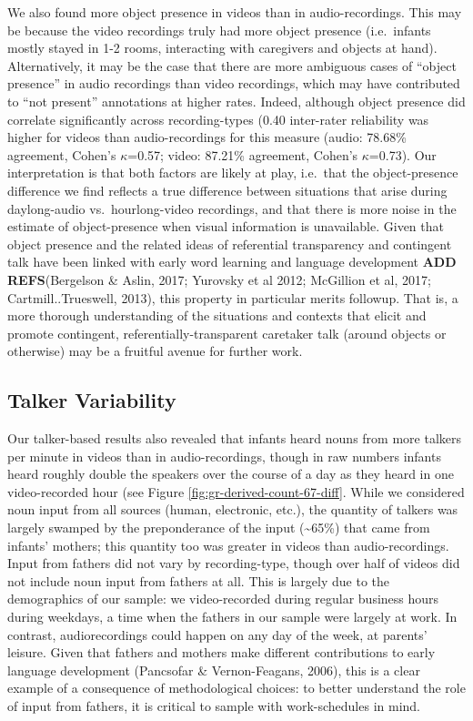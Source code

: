 \documentclass[floatsintext,man]{apa6}
\theoremstyle{definition}
\theoremstyle{definition}
\theoremstyle{definition}
\theoremstyle{remark}
\begin{document}
We also found more object presence in videos than in audio-recordings.
This may be because the video recordings truly had more object presence
(i.e.~infants mostly stayed in 1-2 rooms, interacting with caregivers
and objects at hand). Alternatively, it may be the case that there are
more ambiguous cases of \enquote{object presence} in audio recordings
than video recordings, which may have contributed to \enquote{not
present} annotations at higher rates. Indeed, although object presence
did correlate significantly across recording-types (0.40 inter-rater
reliability was higher for videos than audio-recordings for this measure
(audio: 78.68\% agreement, Cohen's \(\kappa\)=0.57; video: 87.21\%
agreement, Cohen's \(\kappa\)=0.73). Our interpretation is that both
factors are likely at play, i.e.~that the object-presence difference we
find reflects a true difference between situations that arise during
daylong-audio vs.~hourlong-video recordings, and that there is more
noise in the estimate of object-presence when visual information is
unavailable. Given that object presence and the related ideas of
referential transparency and contingent talk have been linked with early
word learning and language development \textbf{ADD REFS}(Bergelson \&
Aslin, 2017; Yurovsky et al 2012; McGillion et al, 2017;
Cartmill..Trueswell, 2013), this property in particular merits followup.
That is, a more thorough understanding of the situations and contexts
that elicit and promote contingent, referentially-transparent caretaker
talk (around objects or otherwise) may be a fruitful avenue for further
work.

\subsection{Talker Variability}\label{talker-variability}

Our talker-based results also revealed that infants heard nouns from
more talkers per minute in videos than in audio-recordings, though in
raw numbers infants heard roughly double the speakers over the course of
a day as they heard in one video-recorded hour (see Figure
\ref{fig:gr-derived-count-67-diff}. While we considered noun input from
all sources (human, electronic, etc.), the quantity of talkers was
largely swamped by the preponderance of the input
(\textasciitilde{}65\%) that came from infants' mothers; this quantity
too was greater in videos than audio-recordings. Input from fathers did
not vary by recording-type, though over half of videos did not include
noun input from fathers at all. This is largely due to the demographics
of our sample: we video-recorded during regular business hours during
weekdays, a time when the fathers in our sample were largely at work. In
contrast, audiorecordings could happen on any day of the week, at
parents' leisure. Given that fathers and mothers make different
contributions to early language development (Pancsofar \&
Vernon-Feagans, 2006), this is a clear example of a consequence of
methodological choices: to better understand the role of input from
fathers, it is critical to sample with work-schedules in mind.
\end{document}
